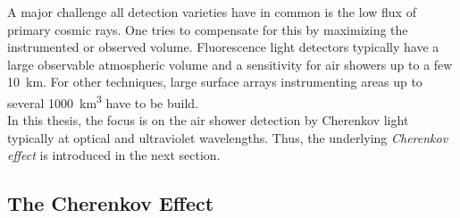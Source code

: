 A major challenge all detection varieties have in common is the low flux of primary cosmic rays. One tries to compensate for this by maximizing the instrumented or observed volume. Fluorescence light detectors typically have a large observable atmospheric volume and a sensitivity for air showers up to a few \SI{10}{\kilo\meter}. For other techniques, large surface arrays instrumenting areas up to several \SI{1000}{\cubic\kilo\meter} have to be build.~\cite{airshowers:schroeder}\\

In this thesis, the focus is on the air shower detection by Cherenkov light typically at optical and ultraviolet wavelengths. Thus, the underlying \textit{Cherenkov effect} is introduced in the next section.

\subsection{The Cherenkov Effect}\label{sec:intro:cherenkov}

